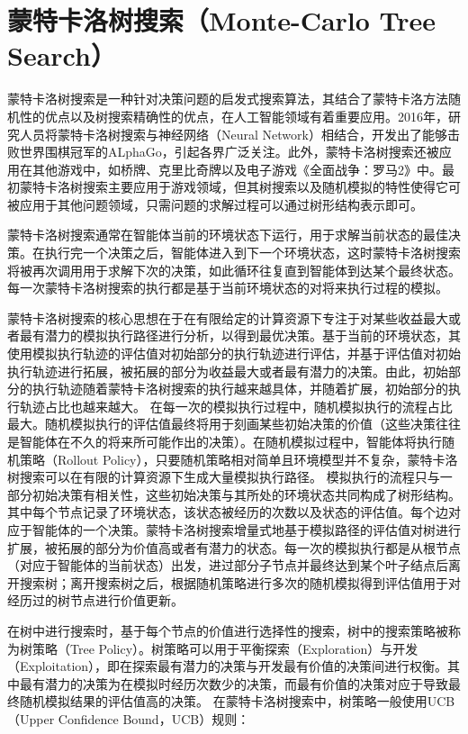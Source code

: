 \section{蒙特卡洛树搜索（Monte-Carlo Tree Search）}
蒙特卡洛树搜索是一种针对决策问题的启发式搜索算法\cite{DBLP:conf/aiide/ChaslotBSS08,chaslot2006monte,DBLP:conf/ecml/KocsisS06}，其结合了蒙特卡洛方法随机性的优点以及树搜索精确性的优点，在人工智能领域有着重要应用。2016年，研究人员将蒙特卡洛树搜索与神经网络（Neural Network）相结合，开发出了能够击败世界围棋冠军的ALphaGo\cite{DBLP:journals/nature/SilverHMGSDSAPL16}，引起各界广泛关注。此外，蒙特卡洛树搜索还被应用在其他游戏中，如桥牌、克里比奇牌以及电子游戏《全面战争：罗马2》中。最初蒙特卡洛树搜索主要应用于游戏领域，但其树搜索以及随机模拟的特性使得它可被应用于其他问题领域，只需问题的求解过程可以通过树形结构表示即可。

蒙特卡洛树搜索通常在智能体当前的环境状态下运行，用于求解当前状态的最佳决策。在执行完一个决策之后，智能体进入到下一个环境状态，这时蒙特卡洛树搜索将被再次调用用于求解下次的决策，如此循环往复直到智能体到达某个最终状态。每一次蒙特卡洛树搜索的执行都是基于当前环境状态的对将来执行过程的模拟。

蒙特卡洛树搜索的核心思想在于在有限给定的计算资源下专注于对某些收益最大或者最有潜力的模拟执行路径进行分析，以得到最优决策。基于当前的环境状态，其使用模拟执行轨迹的评估值对初始部分的执行轨迹进行评估，并基于评估值对初始执行轨迹进行拓展，被拓展的部分为收益最大或者最有潜力的决策。由此，初始部分的执行轨迹随着蒙特卡洛树搜索的执行越来越具体，并随着扩展，初始部分的执行轨迹占比也越来越大。
在每一次的模拟执行过程中，随机模拟执行的流程占比最大。随机模拟执行的评估值最终将用于刻画某些初始决策的价值（这些决策往往是智能体在不久的将来所可能作出的决策）。在随机模拟过程中，智能体将执行随机策略（Rollout Policy），只要随机策略相对简单且环境模型并不复杂，蒙特卡洛树搜索可以在有限的计算资源下生成大量模拟执行路径。
模拟执行的流程只与一部分初始决策有相关性，这些初始决策与其所处的环境状态共同构成了树形结构。其中每个节点记录了环境状态，该状态被经历的次数以及状态的评估值。每个边对应于智能体的一个决策。蒙特卡洛树搜索增量式地基于模拟路径的评估值对树进行扩展，被拓展的部分为价值高或者有潜力的状态。每一次的模拟执行都是从根节点（对应于智能体的当前状态）出发，进过部分子节点并最终达到某个叶子结点后离开搜索树；离开搜索树之后，根据随机策略进行多次的随机模拟得到评估值用于对经历过的树节点进行价值更新。

%
在树中进行搜索时，基于每个节点的价值进行选择性的搜索，树中的搜索策略被称为树策略（Tree Policy）。树策略可以用于平衡探索（Exploration）与开发（Exploitation），即在探索最有潜力的决策与开发最有价值的决策间进行权衡。其中最有潜力的决策为在模拟时经历次数少的决策，而最有价值的决策对应于导致最终随机模拟结果的评估值高的决策。
在蒙特卡洛树搜索中，树策略一般使用UCB（Upper Confidence Bound，UCB）\cite{DBLP:journals/ml/AuerCF02}规则：


